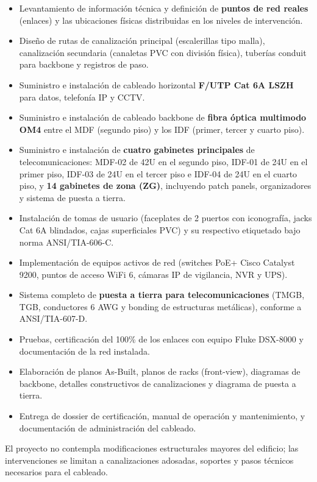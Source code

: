 \begin{itemize}
    \item Levantamiento de información técnica y definición de \textbf{\totalPuntos{} puntos de red reales} (enlaces) y las ubicaciones físicas distribuidas en los \totalPisos{} niveles de intervención.
    \item Diseño de rutas de canalización principal (escalerillas tipo malla), canalización secundaria (canaletas PVC con división física), tuberías conduit para backbone y registros de paso.
    \item Suministro e instalación de cableado horizontal \textbf{F/UTP Cat 6A LSZH} para datos, telefonía IP y CCTV.
    \item Suministro e instalación de cableado backbone de \textbf{fibra óptica multimodo OM4} entre el MDF (segundo piso) y los IDF (primer, tercer y cuarto piso).
    \item Suministro e instalación de \textbf{cuatro gabinetes principales} de telecomunicaciones: MDF-02 de 42U en el segundo piso, IDF-01 de 24U en el primer piso, IDF-03 de 24U en el tercer piso e IDF-04 de 24U en el cuarto piso, y \textbf{14 gabinetes de zona (ZG)}, incluyendo patch panels, organizadores y sistema de puesta a tierra.
    \item Instalación de tomas de usuario (faceplates de 2 puertos con iconografía, jacks Cat 6A blindados, cajas superficiales PVC) y su respectivo etiquetado bajo norma ANSI/TIA-606-C.
    \item Implementación de equipos activos de red (switches PoE+ Cisco Catalyst 9200, puntos de acceso WiFi 6, cámaras IP de vigilancia, NVR y UPS).
    \item Sistema completo de \textbf{puesta a tierra para telecomunicaciones} (TMGB, TGB, conductores 6 AWG y bonding de estructuras metálicas), conforme a ANSI/TIA-607-D.
    \item Pruebas, certificación del 100\% de los enlaces con equipo Fluke DSX-8000 y documentación de la red instalada.
    \item Elaboración de planos As-Built, planos de racks (front-view), diagramas de backbone, detalles constructivos de canalizaciones y diagrama de puesta a tierra.
    \item Entrega de dossier de certificación, manual de operación y mantenimiento, y documentación de administración del cableado.
\end{itemize}

El proyecto no contempla modificaciones estructurales mayores del edificio; las intervenciones se limitan a canalizaciones adosadas, soportes y pasos técnicos necesarios para el cableado.

